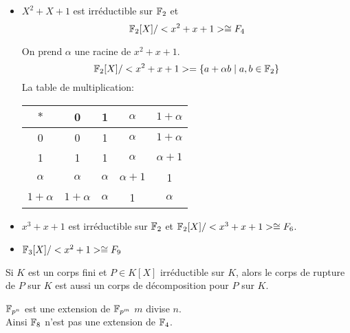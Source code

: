 \begin{example}

	\begin{itemize}
		\item $X^2+X+1$ est irréductible sur $\mathbb{F}_2$ et
		      $$\mathbb{F}_2[X]/ <x^2+x+1> \cong F_4$$

		      On prend $\alpha$ une racine de $x^2+x+1$.
		      $$\mathbb{F}_2[X]/ <x^2+x+1> = \left\{ a + \alpha b \mid a,b \in \mathbb{F}_2\right\}$$
		      La table de multiplication:

		      \begin{center} %
			      \begin{tabular}{c|c|c|c|c}
				      $*$        & 0          & 1        & $\alpha$    & $1+\alpha$  \\
				      \hline
				      0          & 0          & 1        & $\alpha$    & $1+\alpha$  \\
				      \hline
				      1          & 1          & 1        & $\alpha$    & $\alpha +1$ \\
				      \hline
				      $\alpha$   & $\alpha$   & $\alpha$ & $\alpha +1$ & 1           \\
				      \hline
				      $1+\alpha$ & $1+\alpha$ & $\alpha$ & 1           & $\alpha$    \\
			      \end{tabular}
		      \end{center}
		\item$x^3+x+1$ est irréductible sur $\mathbb{F}_2$ et $\mathbb{F}_2[X]/ <x^3+x+1> \cong F_6$.
		\item$ \mathbb{F}_3[X]/ <x^2+1> \cong F_9$
	\end{itemize}
\end{example}


\begin{exercice}
	Si $K$ est un corps fini et $P \in K[X]$ irréductible sur $K$, alors le
	corps de rupture de $P$ sur $K$ est aussi un corps de décomposition pour $P$ sur $K$.
\end{exercice}

\begin{remarque}
	$\mathbb{F}_{p^n}$ est une extension de $\mathbb{F}_{p^m}$ \ssi $m$ divise $n$.\\
	Ainsi $\mathbb{F}_8$ n'est pas une extension de $\mathbb{F}_4$. \\
\end{remarque}




